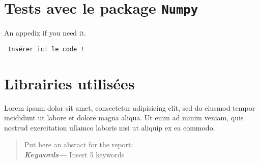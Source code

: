 \documentclass[a4paper, oneside, french, 12pt, final]{extreport}
\providecommand{\keywords}[1]{\textbf{\textit{Keywords---}} #1}
\begin{document}
\section{Tests avec le package {\tt Numpy}}

 An appedix if you need it.
 
 \begin{verbatim}
 Insérer ici le code !
 \end{verbatim}

\section{Librairies utilisées}
 
  Lorem ipsum dolor sit amet, consectetur adipisicing elit, sed do eiusmod
  tempor incididunt ut labore et dolore magna aliqua. Ut enim ad minim veniam,
  quis nostrud exercitation ullamco laboris nisi ut aliquip ex ea commodo.






\cleardoublepage%


\printglossaries
\printindex

\begin{abstract}

Put here an absract for the report; \\

\keywords{Insert 5 keywords}
\end{abstract}
\end{document}
